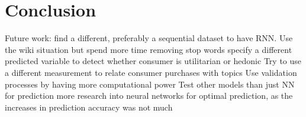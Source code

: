 \section{Conclusion} %
\label{sec:conclusion}


Future work:
find a different, preferably a sequential dataset to have RNN. Use the wiki situation but spend more time removing stop words
specify a different predicted variable to detect whether consumer is utilitarian or hedonic 
Try to use a different measurement to relate consumer purchases with topics 
Use validation processes by having more computational power
Test other models than just NN for prediction 
more research into neural networks for optimal prediction, as the increases in prediction accuracy was not much



